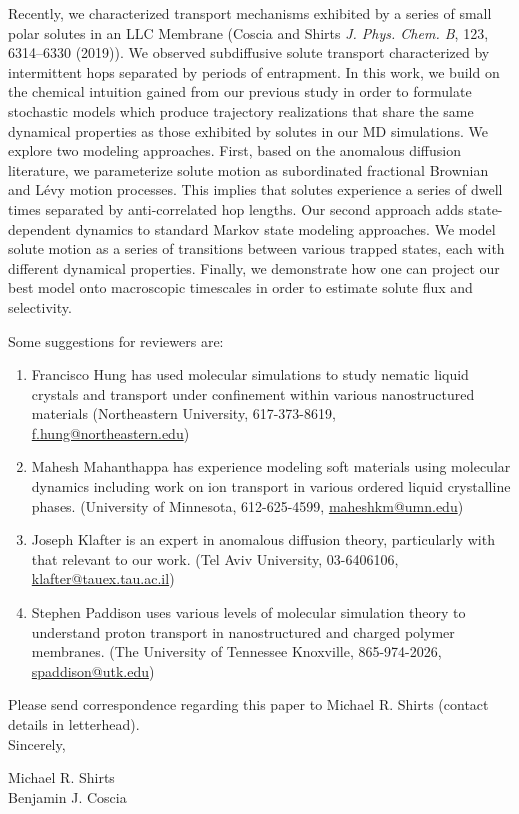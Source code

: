 \documentclass[fontsize=11pt]{article}
\begin{document}
	Recently, we characterized transport mechanisms exhibited by a series of 
	small polar solutes in an LLC Membrane (Coscia and Shirts \textit{J. Phys.
	Chem. B}, 123, 6314--6330 (2019)). We observed subdiffusive solute transport
	characterized by intermittent hops separated by periods of entrapment. In
	this work, we build on the chemical intuition gained from our previous study
	in order to formulate stochastic models which produce trajectory realizations
	that share the same dynamical properties as those exhibited by solutes in 
	our MD simulations. We explore two modeling approaches. First, based on the
	anomalous diffusion literature, we parameterize solute motion as 
    subordinated fractional Brownian and L\'evy motion processes. This implies that 
	solutes experience a series of dwell times separated by anti-correlated hop
	lengths. Our second approach adds state-dependent dynamics to standard Markov
	state modeling approaches. We model solute motion as a series of transitions
	between various trapped states, each with different dynamical properties.
	Finally, we demonstrate how one can project our best model onto macroscopic 
	timescales in order to estimate solute flux and selectivity.
	
	\noindent Some suggestions for reviewers are:
	\begin{enumerate}
	
		\item Francisco Hung has used molecular simulations to study nematic liquid crystals
		and transport under confinement within various nanostructured materials 
		(Northeastern University, 617-373-8619,\\ \href{mailto:f.hung@northeastern.edu}{f.hung@northeastern.edu})
		
		\item Mahesh Mahanthappa has experience modeling soft materials using molecular dynamics
		including work on ion transport in various ordered liquid crystalline phases. 
		(University of Minnesota, 612-625-4599, \href{mailto:maheshkm@umn.edu}{maheshkm@umn.edu})
		
		\item Joseph Klafter is an expert in anomalous diffusion theory, particularly with that 
		relevant to our work. (Tel Aviv University, 03-6406106, \href{mailto:klafter@tauex.tau.ac.il}{klafter@tauex.tau.ac.il})
		
		\item Stephen Paddison uses various levels of molecular simulation theory to understand
		proton transport in nanostructured and charged polymer membranes. (The University of Tennessee 
		Knoxville, 865-974-2026, \href{mailto:spaddison@utk.edu}{spaddison@utk.edu})
		
	\end{enumerate}
	
	\noindent Please send correspondence regarding this paper to Michael R. Shirts (contact
	details in letterhead).\\	
	
	\noindent Sincerely,
	
	\noindent Michael R. Shirts \\
	\noindent Benjamin J. Coscia \\
	
\end{document}
